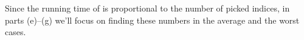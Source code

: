 Since the running time of  is proportional to the number of picked indices, in parts (e)--(g) we'll focus on finding these numbers in the average and the worst cases.
